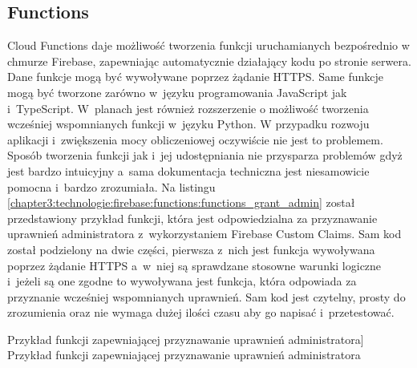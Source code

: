 \documentclass[../Kamil_Kowalewski_Main.tex]{subfiles}
\begin{document}
{{        \subsection{Functions}
        \label{chapter3:technologie:firebase:functions} {
            Cloud Functions daje możliwość tworzenia funkcji uruchamianych
            bezpośrednio w chmurze Firebase, zapewniając automatycznie działający kodu
            po stronie serwera. Dane funkcje mogą być wywoływane poprzez żądanie HTTPS.
            Same funkcje mogą być tworzone zarówno w~języku programowania JavaScript
            jak i~TypeScript. W~planach jest również rozszerzenie o możliwość tworzenia
            wcześniej wspomnianych funkcji w~języku Python. W przypadku rozwoju
            aplikacji i~zwiększenia mocy obliczeniowej oczywiście nie jest to problemem.
            Sposób tworzenia funkcji jak i~jej udostępniania nie przysparza problemów gdyż
            jest bardzo intuicyjny a~sama dokumentacja techniczna jest niesamowicie
            pomocna i~bardzo zrozumiała. Na listingu
            \ref{chapter3:technologie:firebase:functions:functions_grant_admin}
            został przedstawiony przykład funkcji,
            która jest odpowiedzialna za przyznawanie uprawnień administratora
            z~wykorzystaniem Firebase Custom Claims. Sam kod został podzielony na dwie
            części, pierwsza z~nich jest funkcja wywoływana poprzez żądanie HTTPS
            a~w~niej są sprawdzane stosowne warunki logiczne i~jeżeli są one zgodne to
            wywoływana jest funkcja, która odpowiada za przyznanie wcześniej
            wspomnianych uprawnień. Sam kod jest czytelny, prosty do zrozumienia oraz
            nie wymaga dużej ilości czasu aby go napisać i~przetestować.
            \begin{code}[H]
                
                \caption
                [Przykład funkcji zapewniającej przyznawanie uprawnień administratora]
                {Przykład funkcji zapewniającej przyznawanie uprawnień administratora}
                \label{chapter3:technologie:firebase:functions:functions_grant_admin}
            \end{code}
        }
    }
}
\end{document}
